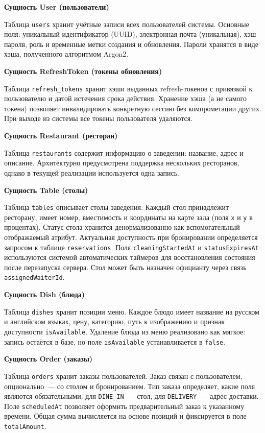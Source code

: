\textbf{Сущность User (пользователи)}

Таблица \texttt{users} хранит учётные записи всех пользователей системы.
Основные поля: уникальный идентификатор (UUID), электронная почта
(уникальная), хэш пароля, роль и временные метки создания и обновления.
Пароли хранятся в виде хэша, полученного алгоритмом Argon2.

\textbf{Сущность RefreshToken (токены обновления)}

Таблица \texttt{refresh\_tokens} хранит хэши выданных refresh-токенов
с привязкой к пользователю и датой истечения срока действия. Хранение
хэша (а не самого токена) позволяет инвалидировать конкретную сессию
без компрометации других. При выходе из системы все токены пользователя
удаляются.

\textbf{Сущность Restaurant (ресторан)}

Таблица \texttt{restaurants} содержит информацию о заведении: название,
адрес и описание. Архитектурно предусмотрена поддержка нескольких
ресторанов, однако в текущей реализации используется одна запись.

\textbf{Сущность Table (столы)}

Таблица \texttt{tables} описывает столы заведения. Каждый стол
принадлежит ресторану, имеет номер, вместимость и координаты на карте
зала (поля \texttt{x} и \texttt{y} в процентах). Статус стола хранится
денормализованно как вспомогательный отображаемый атрибут. Актуальная
доступность при бронировании определяется запросом к таблице
\texttt{reservations}. Поля \texttt{cleaningStartedAt} и
\texttt{statusExpiresAt} используются системой автоматических таймеров
для восстановления состояния после перезапуска сервера. Стол может быть
назначен официанту через связь \texttt{assignedWaiterId}.

\textbf{Сущность Dish (блюда)}

Таблица \texttt{dishes} хранит позиции меню. Каждое блюдо имеет название
на русском и английском языках, цену, категорию, путь к изображению и
признак доступности \texttt{isAvailable}. Удаление блюда из меню
реализовано как мягкое: запись остаётся в базе, но поле
\texttt{isAvailable} устанавливается в \texttt{false}.

\textbf{Сущность Order (заказы)}

Таблица \texttt{orders} хранит заказы пользователей. Заказ связан
с пользователем, опционально~--- со столом и бронированием. Тип заказа
определяет, какие поля являются обязательными: для \texttt{DINE\_IN}~---
стол, для \texttt{DELIVERY}~--- адрес доставки. Поле \texttt{scheduledAt}
позволяет оформить предварительный заказ к указанному времени. Общая
сумма вычисляется на основе позиций и фиксируется в поле
\texttt{totalAmount}.

